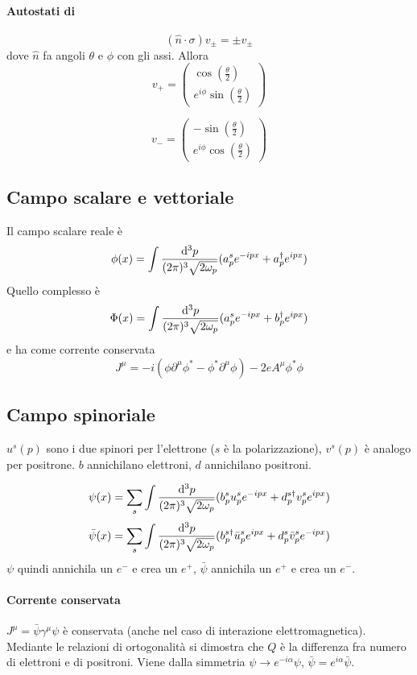 \documentclass[12pt,a4paper]{article}
\begin{document}
	\paragraph{Autostati di \sigma}
	\[ (\hat{n}\cdot\sigma) v_\pm = \pm v_\pm \]
	dove $\hat{n}$ fa angoli $\theta$ e $\phi$ con gli assi. Allora
	\[ v_+ = \begin{pmatrix}
	\cos(\frac{\theta}{2}) \\ e^{i\phi} \sin(\frac{\theta}{2})
	\end{pmatrix} \]
	
	\[ v_- = \begin{pmatrix}
	-\sin(\frac{\theta}{2}) \\ e^{i\phi} \cos(\frac{\theta}{2})
	\end{pmatrix} \]	
	
	\subsection{Campo scalare e vettoriale}
	Il campo scalare reale è
	\[ \phi(x) = \int \dfrac{\mathrm{d}^3 p}{(2\pi)^3\sqrt{2\omega_p}} (a_p^s e^{-ipx} + a_p^\dagger e^{ipx}) \]
	Quello complesso è
	\[ \Phi(x) = \int \dfrac{\mathrm{d}^3 p}{(2\pi)^3\sqrt{2\omega_p}} (a_p^s e^{-ipx} + b_p^\dagger e^{ipx}) \]
	e ha come corrente conservata
	\[ J^\mu = -i(\phi\partial^\mu \phi^* - \phi^*\partial^\mu \phi) -2eA^\mu \phi^*\phi \]
	\subsection{Campo spinoriale}
	$u^s(p)$ sono i due spinori per l'elettrone ($s$ è la polarizzazione), $v^s(p)$ è analogo per positrone. $b$ annichilano elettroni, $d$ annichilano positroni.
	
	\[ \psi(x) = \sum_s \int \dfrac{\mathrm{d}^3 p}{(2\pi)^3\sqrt{2\omega_p}} (b_p^s u_p^s e^{-ipx} + d_p^{s\dagger} v_p^s e^{ipx}) \]
	\[ \bar{\psi}(x) = \sum_s \int \dfrac{\mathrm{d}^3 p}{(2\pi)^3\sqrt{2\omega_p}} (b_p^{s\dagger} \bar{u}_p^s e^{ipx} + d_p^s \bar{v}_p^s e^{-ipx}) \]
	$\psi$ quindi annichila un $e^{-}$ e crea un $e^{+}$, $\bar{\psi}$ annichila un $e^{+}$ e crea un $e^{-}$.
	
	\paragraph{Corrente conservata} $J^\mu = \bar{\psi} \gamma^\mu \psi$ è conservata (anche nel caso di interazione elettromagnetica). Mediante le relazioni di ortogonalità si dimostra che $Q$ è la differenza fra numero di elettroni e di positroni. Viene dalla simmetria $\psi \rightarrow e^{-i\alpha} \psi$, $\bar{\psi} = e^{i\alpha} \bar{\psi}$.
	
\end{document}
